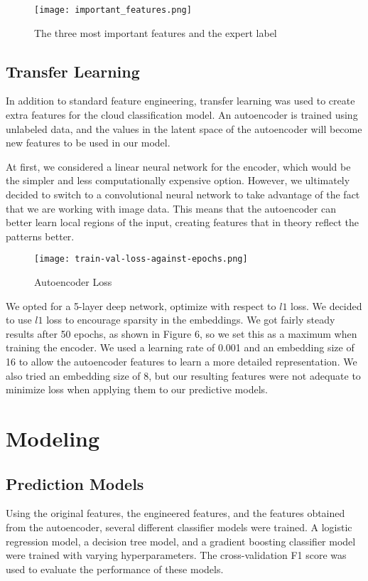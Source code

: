 \documentclass[11pt,letterpaper]{article}
\begin{document}
\begin{figure}[H]
    \centering
    \texttt{[image: important\_features.png]}
    \caption{The three most important features and the expert label}
    \label{fig:enter-label}
\end{figure}

\subsection{Transfer Learning}
In addition to standard feature engineering, transfer learning was used to create extra features for the cloud classification model. An autoencoder is trained using unlabeled data, and the values in the latent space of the autoencoder will become new features to be used in our model.

At first, we considered a linear neural network for the encoder, which would be the simpler and less computationally expensive option. However, we ultimately decided to switch to a convolutional neural network to take advantage of the fact that we are working with image data. This means that the autoencoder can better learn local regions of the input, creating features that in theory reflect the patterns better.

\begin{figure}
    \centering
    \texttt{[image: train-val-loss-against-epochs.png]}
    \caption{Autoencoder Loss}
    \label{fig:enter-label}
\end{figure}

We opted for a 5-layer deep network, optimize with respect to $l1$ loss. We decided to use $l1$ loss to encourage sparsity in the embeddings. We got fairly steady results after 50 epochs, as shown in Figure 6, so we set this as a maximum when training the encoder. We used a learning rate of 0.001 and an embedding size of 16 to allow the autoencoder features to learn a more detailed representation. We also tried an embedding size of 8, but our resulting features were not adequate to minimize loss when applying them to our predictive models.




\section{Modeling}
\subsection{Prediction Models}
Using the original features, the engineered features, and the features obtained from the autoencoder, several different classifier models were trained. A logistic regression model, a decision tree model, and a gradient boosting classifier model were trained with varying hyperparameters. The cross-validation F1 score was used to evaluate the performance of these models.
\end{document}

